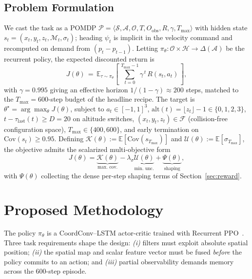 \documentclass[conference]{IEEEtran}
\begin{document}
\subsection{Problem Formulation}

We cast the task as a POMDP $\mathcal{P}\!=\!\langle\mathcal{S},\mathcal{A},\mathcal{O},T,O_{\text{obs}},R,\gamma,T_{\max}\rangle$ with hidden state $s_t = (x_t, y_t, z_t, \mathcal{M}_t, \sigma_t)$; heading $\psi_t$ is implicit in the velocity command and recomputed on demand from $(p_t-p_{t-1})$. Letting $\pi_\theta\!:\!\mathcal{O}\!\times\!\mathcal{H}\!\to\!\Delta(\mathcal{A})$ be the recurrent policy, the expected discounted return is
\begin{equation}
J(\theta) \,=\, \mathbb{E}_{\tau\sim\pi_\theta}\!\left[\,\sum_{t=0}^{T_{\max}-1}\gamma^{\,t}\, R(s_t,a_t)\,\right],
\label{eq:J}
\end{equation}
with $\gamma\!=\!0.995$ giving an effective horizon $1/(1-\gamma)\!\approx\!200$ steps, matched to the $T_{\max}\!=\!600$-step budget of the headline recipe. The target is $\theta^{\star} = \arg\max_{\theta} J(\theta)$, subject to $a_t \in [-1,1]^3$, $\mathrm{alt}(t) = \lfloor z_t\rfloor - 1\in\{0,1,2,3\}$, $t - \tau_{\text{last}}(t)\geq D=20$ on altitude switches, $(x_t,y_t,z_t)\in\mathcal{F}$ (collision-free configuration space), $T_{\max}\!\in\!\{400,600\}$, and early termination on $\mathrm{Cov}(s_t)\geq 0.95$. Defining $\mathcal{K}(\theta)\!:=\!\mathbb{E}[\mathrm{Cov}(s_{T_{\max}})]$ and $\mathcal{U}(\theta)\!:=\!\mathbb{E}[\sigma_{T_{\max}}]$, the objective admits the scalarized multi-objective form
\begin{equation}
J(\theta) = \underbrace{\mathcal{K}(\theta)}_{\text{max.\ cov.}} - \lambda_\sigma\underbrace{\mathcal{U}(\theta)}_{\text{min.\ unc.}} + \underbrace{\Psi(\theta)}_{\text{shaping}},
\label{eq:multiobj}
\end{equation}
with $\Psi(\theta)$ collecting the dense per-step shaping terms of Section~\ref{sec:reward}.

\section{Proposed Methodology}\label{sec:arch}

The policy $\pi_\theta$ is a CoordConv--LSTM actor-critic trained with Recurrent PPO~\cite{raffin2021sb3,ni2022recurrent}. Three task requirements shape the design: \emph{(i)} filters must exploit absolute spatial position; \emph{(ii)} the spatial map and scalar feature vector must be fused \emph{before} the policy commits to an action; and \emph{(iii)} partial observability demands memory across the $600$-step episode.
\end{document}
